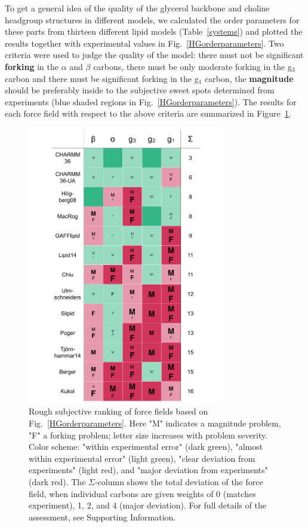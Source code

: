 \documentclass[journal=jpcbfk,manuscript=article]{achemso}
\begin{document}
To get a general idea of the quality of the glycerol backbone and choline headgroup structures in different models, we calculated 
the order parameters for these parts from thirteen different lipid models (Table~\ref{systems}) and 
plotted the results together with experimental values in Fig.~\ref{HGorderparameters}.
Two criteria were used to judge the quality of the model: there must not be significant  {\bf forking} in the $\alpha$ and $\beta$ carbons,
there must be only moderate forking in the g$_3$ carbon and there must be significant forking in the g$_1$ carbon, the {\bf magnitude}
should be preferably inside to the subjective sweet spots determined from experiments (blue shaded regions in Fig.~\ref{HGorderparameters}).
The results for each force field with respect to the above criteria are summarized in Figure~\ref{FullHydrationComparisonTable}.
\begin{figure}[]
  \centering
  \includegraphics[width=8.6cm]{../DATAreportediINblog/comparisonTable.pdf}
  \newline
  \caption{\label{FullHydrationComparisonTable}
Rough subjective ranking of force fields based on Fig.~\ref{HGorderparameters}.
%
Here "M" indicates a magnitude problem, "F" a forking problem;
letter size increases with problem severity.
%
Color scheme:
"within experimental error" (dark green),
"almost within experimental error" (light green),
"clear deviation from experiments" (light red), and
"major deviation from experiments" (dark red).
%
The $\Sigma$-column shows the total deviation of the force field,
when individual carbons are given weights of 0 (matches experiment), 1, 2, and 4 (major deviation).
%
For full details of the assessment, see Supporting Information.
} 
\end{figure}
\end{document}
